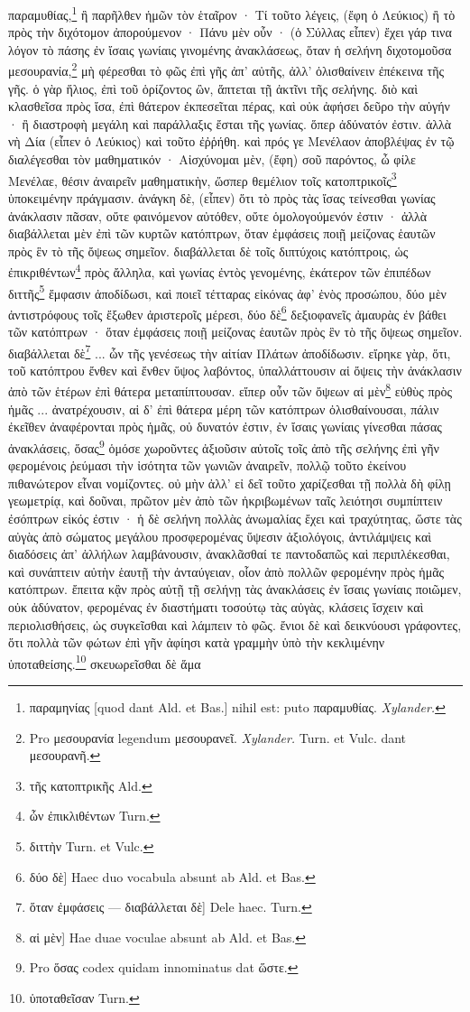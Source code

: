 \documentclass[a4paper, 11pt, oneside, polutonikogreek, german]{article}
\begin{document}
παραμυθίας,\footnote{παραμηνίας [quod dant Ald. et Bas.] nihil est: puto παραμυθίας. \emph{Xylander.}} ἢ παρῆλθεν ἡμῶν τὸν ἑταῖρον · Τί τοῦτο λέγεις, (ἔφη ὁ Λεύκιος) ἢ τὸ πρὸς τὴν διχότομον ἀπορούμενον · Πάνυ μὲν οὖν · (ὁ Σύλλας εἶπεν) ἔχει γάρ τινα λόγον τὸ πάσης ἐν ἴσαις γωνίαις γινομένης ἀνακλάσεως, ὅταν ἡ σελήνη διχοτομοῦσα μεσουρανία,\footnote{Pro μεσουρανία legendum μεσουρανεῖ. \emph{Xylander.} Turn. et Vulc. dant μεσουρανῆ.} μὴ φέρεσθαι τὸ φῶς ἐπὶ γῆς ἀπ' αὐτῆς, ἀλλ' ὀλισθαίνειν ἐπέκεινα τῆς γῆς. ὁ γὰρ ἥλιος, ἐπὶ τοῦ ὁρίζοντος ὢν, ἅπτεται τῇ ἀκτῖνι τῆς σελήνης. διὸ καὶ κλασθεῖσα πρὸς ἴσα, ἐπὶ θάτερον ἐκπεσεῖται πέρας, καὶ οὐκ ἀφήσει δεῦρο τὴν αὐγήν · ἢ διαστροφὴ μεγάλη καὶ παράλλαξις ἔσται τῆς γωνίας. ὅπερ ἀδύνατόν ἐστιν. ἀλλὰ νὴ Δία (εἶπεν ὁ Λεύκιος) καὶ τοῦτο ἐῤῥήθη. καὶ πρός γε Μενέλαον ἀποβλέψας ἐν τῷ διαλέγεσθαι τὸν μαθηματικόν · Αἰσχύνομαι μὲν, (ἔφη) σοῦ παρόντος, ὦ φίλε Μενέλαε, θέσιν ἀναιρεῖν μαθηματικὴν, ὥσπερ θεμέλιον τοῖς κατοπτρικοῖς\footnote{τῆς κατοπτρικῆς Ald.} ὑποκειμένην πράγμασιν. ἀνάγκη δὲ, (εἶπεν) ὅτι τὸ πρὸς τὰς ἴσας τείνεσθαι γωνίας ἀνάκλασιν πᾶσαν, οὔτε φαινόμενον αὐτόθεν, οὔτε ὁμολογούμενόν ἐστιν · ἀλλὰ διαβάλλεται μὲν ἐπὶ τῶν κυρτῶν κατόπτρων, ὅταν ἐμφάσεις ποιῇ μείζονας ἑαυτῶν πρὸς ἓν τὸ τῆς ὄψεως σημεῖον. διαβάλλεται δὲ τοῖς διπτύχοις κατόπτροις, ὡς ἐπικριθέντων\footnote{ὧν ἐπικλιθέντων Turn.} πρὸς ἄλληλα, καὶ γωνίας ἐντὸς γενομένης, ἑκάτερον τῶν ἐπιπέδων διττῆς\footnote{διττὴν Turn. et Vulc.} ἔμφασιν ἀποδίδωσι, καὶ ποιεῖ τέτταρας εἰκόνας ἀφ' ἑνὸς προσώπου, δύο μὲν ἀντιστρόφους τοῖς ἔξωθεν ἀριστεροῖς μέρεσι, δύο δὲ\footnote{δύο δὲ] Haec duo vocabula absunt ab Ald. et Bas.} δεξιοφανεῖς ἀμαυρὰς ἐν βάθει τῶν κατόπτρων · ὅταν ἐμφάσεις ποιῇ μείζονας ἑαυτῶν πρὸς ἓν τὸ τῆς ὄψεως σημεῖον. διαβάλλεται δὲ\footnote{ὅταν ἐμφάσεις --- διαβάλλεται δὲ] Dele haec. Turn.} ... ὧν τῆς γενέσεως τὴν αἰτίαν Πλάτων ἀποδίδωσιν. εἴρηκε γὰρ, ὅτι, τοῦ κατόπτρου ἔνθεν καὶ ἔνθεν ὕψος λαβόντος, ὑπαλλάττουσιν αἱ ὄψεις τὴν ἀνάκλασιν ἀπὸ τῶν ἑτέρων ἐπὶ θάτερα μεταπίπτουσαν. εἴπερ οὖν τῶν ὄψεων αἱ μὲν\footnote{αἱ μὲν] Hae duae voculae absunt ab Ald. et Bas.} εὐθὺς πρὸς ἡμᾶς ... ἀνατρέχουσιν, αἱ δ' ἐπὶ θάτερα μέρη τῶν κατόπτρων ὀλισθαίνουσαι, πάλιν ἐκεῖθεν ἀναφέρονται πρὸς ἡμᾶς, οὐ δυνατόν ἐστιν, ἐν ἴσαις γωνίαις γίνεσθαι πάσας ἀνακλάσεις, ὅσας\footnote{Pro ὅσας codex quidam innominatus dat ὥστε.} ὁμόσε χωροῦντες ἀξιοῦσιν αὐτοῖς τοῖς ἀπὸ τῆς σελήνης ἐπὶ γῆν φερομένοις ῥεύμασι τὴν ἰσότητα τῶν γωνιῶν ἀναιρεῖν, πολλῷ τοῦτο ἐκείνου πιθανώτερον εἶναι νομίζοντες. οὐ μὴν ἀλλ' εἰ δεῖ τοῦτο χαρίζεσθαι τῇ πολλὰ δὴ φίλῃ γεωμετρίᾳ, καὶ δοῦναι, πρῶτον μὲν ἀπὸ τῶν ἠκριβωμένων ταῖς λειότησι συμπίπτειν ἐσόπτρων εἰκός ἐστιν · ἡ δὲ σελήνη πολλὰς ἀνωμαλίας ἔχει καὶ τραχύτητας, ὥστε τὰς αὐγὰς ἀπὸ σώματος μεγάλου προσφερομένας ὕψεσιν ἀξιολόγοις, ἀντιλάμψεις καὶ διαδόσεις ἀπ' ἀλλήλων λαμβάνουσιν, ἀνακλᾶσθαί τε παντοδαπῶς καὶ περιπλέκεσθαι, καὶ συνάπτειν αὐτὴν ἑαυτῇ τὴν ἀνταύγειαν, οἷον ἀπὸ πολλῶν φερομένην πρὸς ἡμᾶς κατόπτρων. ἔπειτα κᾂν πρὸς αὐτῇ τῇ σελήνῃ τὰς ἀνακλάσεις ἐν ἴσαις γωνίαις ποιῶμεν, οὐκ ἀδύνατον, φερομένας ἐν διαστήματι τοσούτῳ τὰς αὐγὰς, κλάσεις ἴσχειν καὶ περιολισθήσεις, ὡς συγκεῖσθαι καὶ λάμπειν τὸ φῶς. ἔνιοι δὲ καὶ δεικνύουσι γράφοντες, ὅτι πολλὰ τῶν φώτων ἐπὶ γῆν ἀφίησι κατὰ γραμμὴν ὑπὸ τὴν κεκλιμένην ὑποταθείσης.\footnote{ὑποταθεῖσαν Turn.} σκευωρεῖσθαι δὲ ἅμα 
\end{document}
